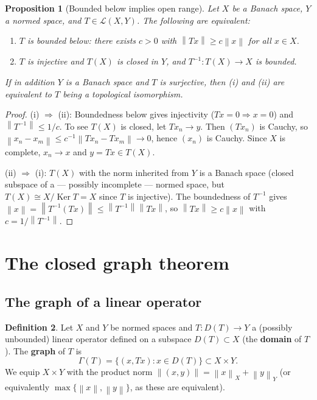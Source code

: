 \documentclass[a4paper,12pt]{book}
\DeclareMathOperator{\Ker}{Ker}
\newcommand{\norm}[1]{\left\| #1 \right\|}
\theoremstyle{definition}
\newtheorem{definition}{Definition}[chapter]
\theoremstyle{plain}
\newtheorem{proposition}[definition]{Proposition}
\theoremstyle{remark}
\begin{document}
\begin{proposition}[Bounded below implies open range]%
\label{prop:bounded-below-open}
Let $X$ be a Banach space, $Y$ a normed space, and $T \in \mathcal{L}(X,Y)$.
The following are equivalent:
\begin{enumerate}[label=(\roman*)]
  \item $T$ is bounded below: there exists $c > 0$ with $\norm{Tx} \geq c\norm{x}$
    for all $x \in X$.
  \item $T$ is injective and $T(X)$ is closed in $Y$, and $T^{-1} \colon T(X) \to X$
    is bounded.
\end{enumerate}
If in addition $Y$ is a Banach space and $T$ is surjective, then (i) and (ii)
are equivalent to $T$ being a topological isomorphism.
\end{proposition}

\begin{proof}
(i) $\Rightarrow$ (ii): Boundedness below gives injectivity ($Tx = 0 \Rightarrow
x = 0$) and $\norm{T^{-1}} \leq 1/c$. To see $T(X)$ is closed, let
$Tx_n \to y$. Then $(Tx_n)$ is Cauchy, so $\norm{x_n - x_m} \leq
c^{-1}\norm{Tx_n - Tx_m} \to 0$, hence $(x_n)$ is Cauchy. Since $X$ is complete,
$x_n \to x$ and $y = Tx \in T(X)$.

(ii) $\Rightarrow$ (i): $T(X)$ with the norm inherited from $Y$ is a Banach space
(closed subspace of a --- possibly incomplete --- normed space, but $T(X) \cong X/\Ker T = X$
since $T$ is injective). The boundedness of $T^{-1}$ gives
$\norm{x} = \norm{T^{-1}(Tx)} \leq \norm{T^{-1}}\norm{Tx}$, so
$\norm{Tx} \geq c\norm{x}$ with $c = 1/\norm{T^{-1}}$.
\end{proof}

\section{The closed graph theorem}\label{sec:cgt}

\subsection{The graph of a linear operator}

\begin{definition}\label{def:graph}
Let $X$ and $Y$ be normed spaces and $T \colon D(T) \to Y$ a (possibly unbounded)
linear operator defined on a subspace $D(T) \subset X$ (the \textbf{domain} of $T$). The \textbf{graph} of $T$ is
\[
  \Gamma(T) = \{(x, Tx) : x \in D(T)\} \subset X \times Y.
\]
We equip $X \times Y$ with the product norm
$\norm{(x,y)} = \norm{x}_X + \norm{y}_Y$ (or equivalently
$\max\{\norm{x}, \norm{y}\}$, as these are equivalent).
\end{definition}
\end{document}
